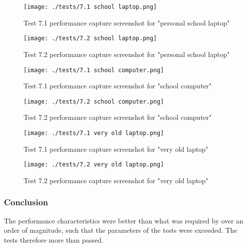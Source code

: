 \begin{figure}[H]
	\centering
	\texttt{[image: ./tests/7.1 school laptop.png]}
	\caption{Test 7.1 performance capture screenshot for "personal school laptop"}
\end{figure}
\begin{figure}[H]
	\centering
	\texttt{[image: ./tests/7.2 school laptop.png]}
	\caption{Test 7.2 performance capture screenshot for "personal school laptop"}
\end{figure}
\begin{figure}[H]
	\centering
	\texttt{[image: ./tests/7.1 school computer.png]}
	\caption{Test 7.1 performance capture screenshot for "school computer"}
\end{figure}
\begin{figure}[H]
	\centering
	\texttt{[image: ./tests/7.2 school computer.png]}
	\caption{Test 7.2 performance capture screenshot for "school computer"}
\end{figure}
\begin{figure}[H]
	\centering
	\texttt{[image: ./tests/7.1 very old laptop.png]}
	\caption{Test 7.1 performance capture screenshot for "very old laptop"}
\end{figure}
\begin{figure}[H]
	\centering
	\texttt{[image: ./tests/7.2 very old laptop.png]}
	\caption{Test 7.2 performance capture screenshot for "very old laptop"}
\end{figure}


\subsubsection*{Conclusion}
The performance characteristics were better than what was required by over an order of magnitude, such that the parameters of the tests were exceeded. The tests therefore more than passed.